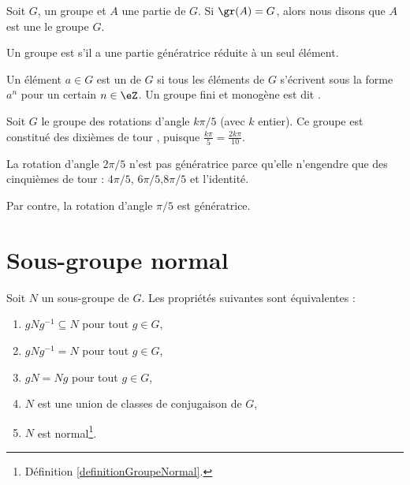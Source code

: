 \begin{definition}  \label{DEFooWMFVooLDqVxR}
    Soit \( G\), un groupe et \( A\) une partie de \( G\). Si \( \gr(A)=G\), alors nous disons que \( A\) est une  le groupe \( G\).

    Un groupe est  s'il a une partie génératrice réduite à un seul élément.
\end{definition}

\begin{definition}     \label{DefHFJWooFxkzCF}
    Un élément \( a\in G\) est un  de \( G\) si tous les éléments de \( G\) s'écrivent sous la forme \( a^n\) pour un certain \( n\in\eZ\). Un groupe fini et monogène est dit .
\end{definition}

\begin{example}
    Soit \( G\) le groupe des rotations d'angle \( k\pi/5\) (avec \( k \) entier). Ce groupe est constitué des \og{} dixièmes de tour \fg{}, puisque \( \frac{k\pi} 5 = \frac{2k\pi}{10}.\)
    
     La rotation d'angle \( 2 \pi/5\)  n'est pas génératrice parce qu'elle n'engendre que des \og{} cinquièmes de tour \fg{} : \( 4 \pi/5\), \( 6 \pi/ 5\),\( 8\pi/5\) et l'identité.
     
     Par contre, la rotation d'angle \( \pi/5\) est génératrice.
\end{example}

\section{Sous-groupe normal}

\begin{proposition}\label{propGroupeNormal}
    Soit \( N\) un sous-groupe de \( G\). Les propriétés suivantes sont équivalentes :
    \begin{enumerate}
        \item
            \( gNg^{-1}\subseteq N\) pour tout \( g\in G\),
        \item
            \( gNg^{-1}= N\) pour tout \( g\in G\),
        \item
            \( gN=Ng\) pour tout \( g\in G\),
        \item
            \( N\) est une union de classes de conjugaison de \( G\),
        \item
            \( N\) est normal\footnote{Définition \ref{definitionGroupeNormal}.}.
    \end{enumerate}
\end{proposition}

